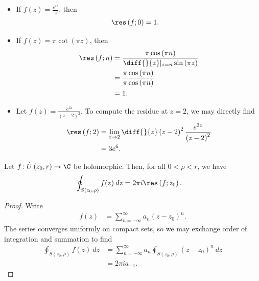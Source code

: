 \documentclass[10pt]{mypackage}
\begin{document}
\begin{example}\hfill
  \begin{itemize}
    \item If $f(z) = \frac{e^{iz}}{z}$, then
      \begin{align*}
        \res\left( f;0 \right) &= 1.
      \end{align*}
    \item If $f(z) = \pi \cot\left( \pi z \right)$, then
      \begin{align*}
        \res\left( f;n \right) &= \frac{\pi \cos\left( \pi n \right)}{ \diff{}{z}|_{z = n} \sin\left( \pi z \right) }\\
                               &= \frac{\pi \cos\left( \pi n \right)}{\pi \cos\left( \pi n \right)}\\
                               &= 1.
      \end{align*}
    \item Let $f(z) = \frac{e^{3z}}{\left( z-2 \right)^2}$. To compute the residue at $z = 2$, we may directly find
      \begin{align*}
        \res\left( f;2 \right) &= \lim_{z\rightarrow 2} \diff{}{z}\left( z-2 \right)^2 \frac{e^{3z}}{\left( z-2 \right)^2}\\
                               &= 3e^{6}.
      \end{align*}
  \end{itemize}
\end{example}
\begin{theorem}
  Let $f\colon \dot{U}\left( z_0,r \right)\rightarrow \C$ be holomorphic. Then, for all $0 < \rho < r$, we have
  \begin{align*}
    \oint_{S\left( z_0,\rho \right)}^{} f(z)\:dz &= 2\pi i \res\left( f;z_0 \right).
  \end{align*}
\end{theorem}
\begin{proof}
  Write
  \begin{align*}
    f(z) &= \sum_{n=-\infty}^{\infty} a_n\left( z-z_0 \right)^{n}.
  \end{align*}
  The series converges uniformly on compact sets, so we may exchange order of integration and summation to find
  \begin{align*}
    \oint_{S\left( z_0,\rho \right)}^{} f(z)\:dz &= \sum_{n=-\infty}^{\infty}a_n \oint_{S\left( z_0,\rho \right)}^{} \left( z-z_0 \right)^{n}\:dz\\
                                                 &= 2\pi i a_{-1}.
  \end{align*}
\end{proof}
\end{document}
